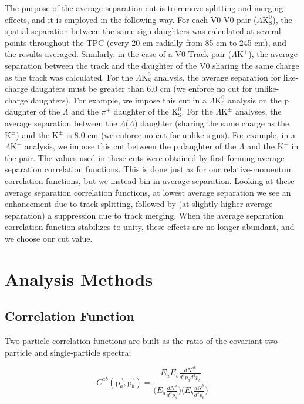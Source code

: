 \documentclass[ALICE,manyauthors]{cernphprep}
\newcommand{\Lam}{$\Lambda$\xspace}
\newcommand{\LamALam}{$\Lambda$($\bar{\Lambda}$)\xspace}
\newcommand{\KchP}{$\mathrm{K^{+}}$\xspace}
\newcommand{\Kpm}{$\mathrm{K^{\pm}}$\xspace}
\newcommand{\Ks}{$\mathrm{K^{0}_{S}}$\xspace}
\newcommand{\LamKchP}{$\Lambda\mathrm{K^{+}}$\xspace}
\newcommand{\LamKpm}{$\Lambda\mathrm{K^{\pm}}$\xspace}
\newcommand{\LamKs}{$\Lambda\mathrm{K^{0}_{S}}$\xspace}
\begin{document}
The purpose of the average separation cut is to remove splitting and merging effects, and it is employed in the following way.  
For each V0-V0 pair (\LamKs), the spatial separation between the same-sign daughters was calculated at several points throughout the TPC (every 20 cm radially from 85 cm to 245 cm), and the results averaged.
Similarly, in the case of a V0-Track pair (\LamKpm), the average separation between the track and the daughter of the V0 sharing the same charge as the track was calculated.
For the \LamKs analysis, the average separation for like-charge daughters must be greater than 6.0 cm (we enforce no cut for unlike-charge daughters).  
For example, we impose this cut in a \LamKs analysis on the p daughter of the \Lam and the $\pi^{+}$ daughter of the \Ks.  
For the \LamKpm analyses, the average separation between the \LamALam daughter (sharing the same charge as the \Kpm) and the \Kpm is 8.0 cm (we enforce no cut for unlike signs).  
For example, in a \LamKchP analysis, we impose this cut between the p daughter of the \Lam and the \KchP in the pair.
The values used in these cuts were obtained by first forming average separation correlation functions.
This is done just as for our relative-momentum correlation functions, but we instead bin in average separation.
Looking at these average separation correlation functions, at lowest average separation we see an enhancement due to track splitting, followed by (at slightly higher average separation) a suppression due to track merging.
When the average separation correlation function stabilizes to unity, these effects are no longer abundant, and we choose our cut value.




\section{Analysis Methods}
\label{sec:AnalysisMethods}

\subsection{Correlation Function}
\label{sec:CorrelationFunction}
Two-particle correlation functions are built as the ratio of the covariant two-particle and single-particle spectra:

\begin{equation}
  C^{ab}(\vec{\mathrm{p}_{a}},\vec{\mathrm{p}_{b}}) = \frac{E_{a}E_{b}\frac{dN^{ab}}{d^{3}p_{a}d^{3}p_{b}}}{\big( E_{a}\frac{dN^{a}}{d^{3}p_{a}} \big) \big( E_{b}\frac{dN^{b}}{d^{3}p_{b}} \big)}
\label{eqn:CfRatioSpectra}
\end{equation}
\end{document}
